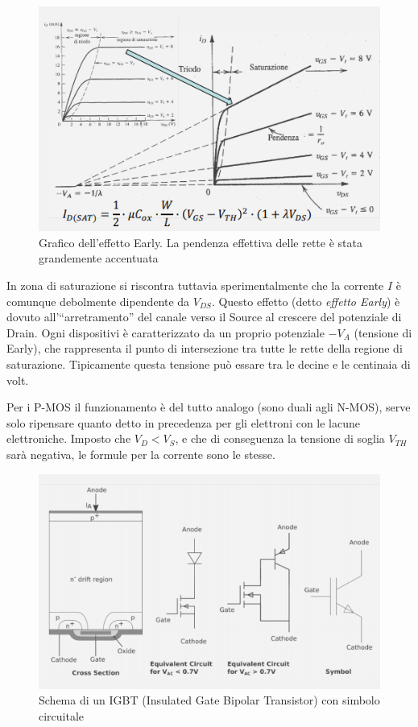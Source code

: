\documentclass{article}
\begin{document}
\begin{figure}[h]
  \centering
  \includegraphics[scale=0.85]{IM_Effetto_Early}
  \caption{Grafico dell'effetto Early. La pendenza effettiva delle rette è stata grandemente accentuata}
  \label{Schema_Effetto_Early}
\end{figure}

In zona di saturazione si riscontra tuttavia sperimentalmente che la corrente $I$ è comunque debolmente dipendente da $V_{DS}$. Questo effetto (detto \textit{effetto Early}) è dovuto all'``arretramento'' del canale verso il Source al crescere del potenziale di Drain. Ogni dispositivi è caratterizzato da un proprio potenziale $-V_A$ (tensione di Early), che rappresenta il punto di intersezione tra tutte le rette della regione di saturazione. Tipicamente questa tensione può essare tra le decine e le centinaia di volt.

\vspace{3mm}

Per i P-MOS il funzionamento è del tutto analogo (sono duali agli N-MOS), serve solo ripensare quanto detto in precedenza per gli elettroni con le lacune elettroniche. Imposto che $V_D < V_S$, e che di conseguenza la tensione di soglia $V_{TH}$ sarà negativa, le formule per la corrente sono le stesse.
\clearpage
\begin{figure}[h]
  \centering
  \includegraphics[scale=0.6]{IM_IGBT}
  \caption{Schema di un IGBT (Insulated Gate Bipolar Transistor) con simbolo circuitale}
  \label{Schema_IGBT}
\end{figure}
\end{document}
